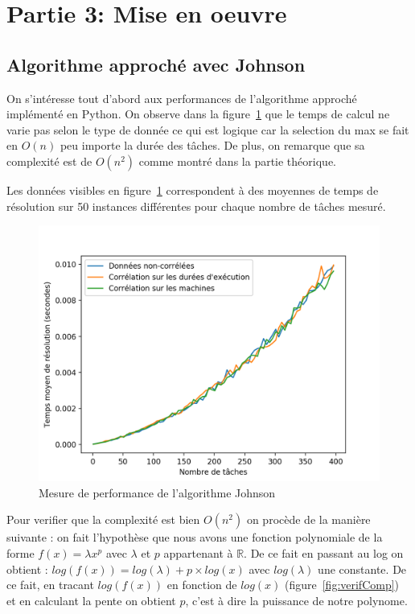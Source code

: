 \documentclass[a4paper, 10pt]{article}
\begin{document}
	\section*{Partie 3: Mise en oeuvre}
		\subsection*{Algorithme approché avec Johnson}
		
		On s'intéresse tout d'abord aux performances de l'algorithme approché implémenté en Python. On observe dans la figure~\ref{fig:tj} que le temps de calcul ne varie pas selon le type de donnée ce qui est logique car la selection du max se fait en $O(n)$ peu importe la durée des tâches. De plus, on remarque que sa complexité est de $O(n^2)$ comme montré dans la partie théorique.
		
		Les données visibles en figure~\ref{fig:tj} correspondent à des moyennes de temps de résolution sur 50 instances différentes pour chaque nombre de tâches mesuré.
		
		\begin{figure}[H]
			\centering
			\includegraphics[width=0.85\linewidth]{graphes/Johnson.png}
			\caption{Mesure de performance de l'algorithme Johnson}
			\label{fig:tj}
		\end{figure}

                Pour verifier que la complexité est bien $O(n^2)$ on procède de la manière suivante : on fait l'hypothèse que nous avons une fonction polynomiale de la forme $f(x) = \lambda x^p$ avec $\lambda$ et $p$ appartenant à $\mathbb{R}$. De ce fait en passant au log on obtient : $log(f(x)) = log(\lambda) + p \times log(x)$ avec $log(\lambda)$ une constante. De ce fait, en tracant $log(f(x))$ en fonction de $log(x)$ (figure~\ref{fig:verifComp}) et en calculant la pente on obtient $p$, c'est à dire la puissance de notre polynome.
\end{document}
